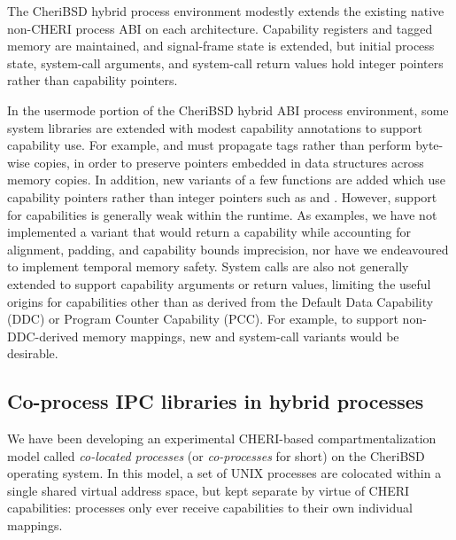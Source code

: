 \documentclass[12pt,twoside,openright,a4paper]{article}
\newcommand{\ccode}[1]{{\small\ttfamily{#1}}}
\newcommand{\note}[2]{{\color{blue}[ Note: #1 - #2]}}
\renewcommand{\note}[2]{\relax\ifhmode\unskip\fi}
\newcommand{\rwnote}[1]{\note{#1}{Robert W.}}
\newcommand{\psnote}[1]{\note{#1}{Peter S.}}
\newcommand{\jhbnote}[1]{\note{#1}{John B.}}
\begin{document}
The CheriBSD hybrid process environment modestly extends the existing native
non-CHERI process ABI on each architecture.
Capability registers and tagged memory are maintained, and signal-frame state
is extended, but initial process state, system-call arguments, and system-call
return values hold integer pointers rather than capability pointers.

In the usermode portion of the CheriBSD hybrid ABI process environment, some
system libraries are extended with modest capability annotations to support
capability use.
For example, \ccode{memcpy()} and \ccode{sort()} must propagate tags rather
than perform byte-wise copies, in order to preserve pointers embedded in data
structures across memory copies.
In addition, new variants of a few functions are added which use
capability pointers rather than integer pointers such as
\ccode{memcpy\_c()} and \ccode{memset\_c()}.
\psnote{Apart from that??}
\psnote{[limited/weak] ?}
However, support for capabilities is generally weak within the runtime.
As examples, we have not implemented a \ccode{malloc\_c()} variant that would
return a capability while accounting for alignment, padding, and
capability bounds imprecision, nor have we endeavoured to implement temporal memory safety.
\psnote{hard to parse the latter parts of the preceding sentence}
\rwnote{Possibly now improved?}
\jhbnote{I think it is confusing to mention \ccode{malloc\_c()} this
  early as the idea of \ccode{*\_c()} variants isn't yet explained.  I
  have tried to rectify this a bit.}
System calls are also not generally extended to support capability arguments
or return values, limiting the useful origins for capabilities other than as
derived from the Default Data Capability (DDC) or Program Counter Capability
(PCC).
For example, to support non-DDC-derived memory mappings, new \ccode{mmap\_c}
and \ccode{munmap\_c} system-call variants would be desirable.

\subsection{Co-process IPC libraries in hybrid processes}

We have been developing an experimental CHERI-based compartmentalization model
called \textit{co-located processes} (or \textit{co-processes} for short) on
the CheriBSD operating system.
In this model, a set of UNIX processes are colocated within a single shared
virtual address space, but kept separate by virtue of CHERI capabilities:
processes only ever receive capabilities to their own individual mappings.
\end{document}
